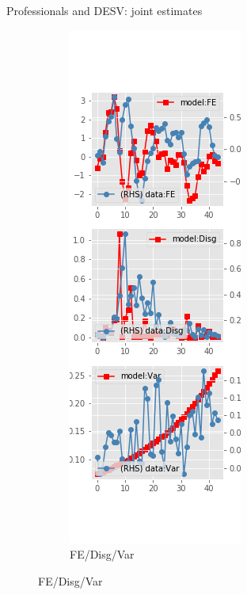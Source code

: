 \documentclass{beamer}
\begin{document}
\begin{frame}{Professionals and DESV: joint estimates}
\begin{figure}[ht]
\begin{subfigure}[b]{0.2\textwidth}
		\end{subfigure}
		\hfill
		\begin{subfigure}[b]{0.2\textwidth}
			\caption{FE/Disg/Var}
			\includegraphics[width=\textwidth, height = 0.8\textheight]{figuresDraft/spf_de_est_sv_joint_diag2.png}
		\end{subfigure}
	\end{figure}
\end{frame}
\end{document}
